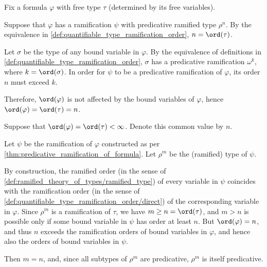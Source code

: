 \begin{defproof}
  Fix a formula \( \varphi \) with free type \( \tau \) (determined by its free variables).

   Suppose that \( \varphi \) has a ramification \( \psi \) with predicative ramified type \( \rho^n \). By the equivalence in \cref{def:quantifiable_type_ramification_order}, \( n = \ord(\tau) \).

  Let \( \sigma \) be the type of any bound variable in \( \varphi \). By the equivalence of definitions in \cref{def:quantifiable_type_ramification_order}, \( \sigma \) has a predicative ramification \( \omega^k \), where \( k = \ord(\sigma) \). In order for \( \psi \) to be a predicative ramification of \( \varphi \), its order \( n \) must exceed \( k \).

  Therefore, \( \ord(\varphi) \) is not affected by the bound variables of \( \varphi \), hence \( \ord(\varphi) = \ord(\tau) = n \).

   Suppose that \( \ord(\varphi) = \ord(\tau) < \infty \). Denote this common value by \( n \).

  Let \( \psi \) be the ramification of \( \varphi \) constructed as per \cref{thm:predicative_ramification_of_formula}. Let \( \rho^m \) be the (ramified) type of \( \psi \).

  By construction, the ramified order (in the sense of \cref{def:ramified_theory_of_types/ramified_type}) of every variable in \( \psi \) coincides with the ramification order (in the sense of \ref{def:quantifiable_type_ramification_order/direct}) of the corresponding variable in \( \varphi \). Since \( \rho^m \) is a ramification of \( \tau \), we have \( m \geq n = \ord(\tau) \), and \( m > n \) is possible only if some bound variable in \( \psi \) has order at least \( n \). But \( \ord(\varphi) = n \), and thus \( n \) exceeds the ramification orders of bound variables in \( \varphi \), and hence also the orders of bound variables in \( \psi \).

  Then \( m = n \), and, since all subtypes of \( \rho^m \) are predicative, \( \rho^m \) is itself predicative.
\end{defproof}

